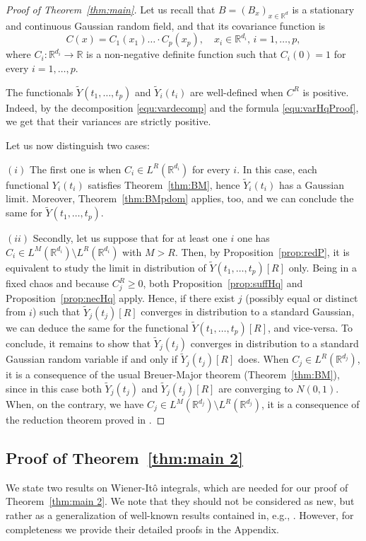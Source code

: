 \documentclass[12pt]{article}
\DeclareMathOperator{\1}{1}
\newcommand{\R}{\mathbb{R}}
\renewcommand{\L}{ L}
\theoremstyle{plain}
\theoremstyle{definition}
\begin{document}
\begin{proof}[Proof of Theorem~\ref{thm:main}]
Let us recall that $B=(B_x)_{x\in\R^d}$ is a stationary and continuous Gaussian random field, and that its covariance function is \begin{equation}
    C(x) = C_1(x_1) \ldots \cdot C_p(x_p), \quad x_i\in\R^{d_i}, \,i=1,\ldots,p,
\end{equation}
where $C_i:\R^{d_i}\to \R$ is a non-negative definite function such that $C_i(0)=1$ for every $i=1,\ldots,p$. 

The functionals $\widetilde Y(t_1,\ldots,t_p)$ and $\widetilde  Y_i(t_i)$ are well-defined when $C^R$ is positive. Indeed, by the decomposition \eqref{equ:vardecomp} and the formula \eqref{equ:varHqProof}, we get that their variances are strictly positive.

Let us now distinguish two cases:

$(i)$ The first one is when $C_i\in \L^R(\R^{d_i})$ for every $i$. In this case, each functional $Y_i(t_i)$ satisfies Theorem~\ref{thm:BM}, hence $\widetilde Y_i(t_i)$ has a Gaussian limit. Moreover, Theorem~\ref{thm:BMpdom} applies, too, and we can conclude the same for $\widetilde Y(t_1,\ldots,t_p)$.

$(ii)$ Secondly, let us suppose that for at least one $i$ one has $C_i \in \L^M(\R^{d_i})\setminus \L^R(\R^{d_i})$ with $M>R$. Then, by Proposition~\ref{prop:redP}, it is equivalent to study the limit in distribution of $\widetilde Y(t_1,\ldots,t_p)[R]$ only. Being in a fixed chaos and because $C_j^R\ge 0$, both Proposition~\ref{prop:suffHq} and Proposition~\ref{prop:necHq} apply. Hence, if there exist $j$ (possibly equal or distinct from $i$) such that $\widetilde Y_j(t_j)[R]$ converges in distribution to a standard Gaussian, we can deduce the same for the functional $\widetilde Y(t_1,\ldots,t_p)[R]$, and vice-versa. 
To conclude, it remains to show that $\widetilde Y_j(t_j)$ converges in distribution to a standard Gaussian random variable if and only if $\widetilde Y_j(t_j)[R]$ does. When $C_j \in \L^R(\R^{d_j})$, it is a consequence of the usual Breuer-Major theorem (Theorem~\ref{thm:BM}), since in this case both $\widetilde Y_j(t_j)$ and $\widetilde Y_j(t_j)[R]$ are converging to $N(0,1)$. When, on the contrary, we have $C_j\in L^M(\R^{d_j})\setminus L^R(\R^{d_j})$, it is a consequence of the reduction theorem proved in \cite[Proposition 4]{MN22}. 
\end{proof}


\subsection{Proof of Theorem~\ref{thm:main 2}}\label{subsec:noncentralproof}
We state two results on Wiener-It\^o integrals, which are needed for our proof of Theorem~\ref{thm:main 2}. We note that they should not be considered as new, but rather as a generalization of well-known results contained in, e.g., \cite{M81}. However, for completeness we provide their detailed proofs in the Appendix.
\end{document}
